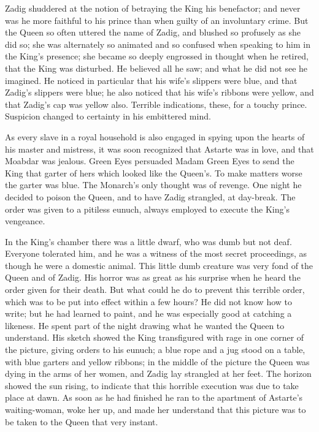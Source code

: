 \documentclass{article}
\begin{document}
\begin{center}
Zadig shuddered at the notion of betraying the King his benefactor; and never was 
he more faithful to his prince than when guilty of an involuntary crime. But the 
Queen so often uttered the name of Zadig, and blushed so profusely as she did so; 
she was alternately so animated and so confused when speaking to him in the King's 
presence; she became so deeply engrossed in thought when he retired, that the King 
was disturbed. He believed all he saw; and what he did not see he imagined. He 
noticed in particular that his wife's slippers were blue, and that Zadig's slippers 
were blue; he also noticed that his wife's ribbons were yellow, and that Zadig's 
cap was yellow also. Terrible indications, these, for a touchy prince. Suspicion 
changed to certainty in his embittered mind. 

As every slave in a royal household is also engaged in spying upon the hearts of 
his master and mistress, it was soon recognized that Astarte was in love, and that 
Moabdar was jealous. Green Eyes persuaded Madam Green Eyes to send the King that 
garter of hers which looked like the Queen's. To make matters worse the garter 
was blue. The Monarch's only thought was of revenge. One night he decided to poison 
the Queen, and to have Zadig strangled, at day-break. The order was given to a 
pitiless eunuch, always employed to execute the King's vengeance. 

In the King's chamber there was a little dwarf, who was dumb but not deaf. Everyone 
tolerated him, and he was a witness of the most secret proceedings, as though he 
were a domestic animal. This little dumb creature was very fond of the Queen and 
of Zadig. His horror was as great as his surprise when he heard the order given 
for their death. But what could he do to prevent this terrible order, which was 
to be put into effect within a few hours? He did not know how to write; but he 
had learned to paint, and he was especially good at catching a likeness. He spent 
part of the night drawing what he wanted the Queen to understand. His sketch showed 
the King transfigured with rage in one corner of the picture, giving orders to 
his eunuch; a blue rope and a jug stood on a table, with blue garters and yellow 
ribbons; in the middle of the picture the Queen was dying in the arms of her women, 
and Zadig lay strangled at her feet. The horizon showed the sun rising, to indicate 
that this horrible execution was due to take place at dawn. As soon as he had finished 
he ran to the apartment of Astarte's waiting-woman, woke her up, and made her understand 
that this picture was to be taken to the Queen that very instant. 


\end{center}
\end{document}
